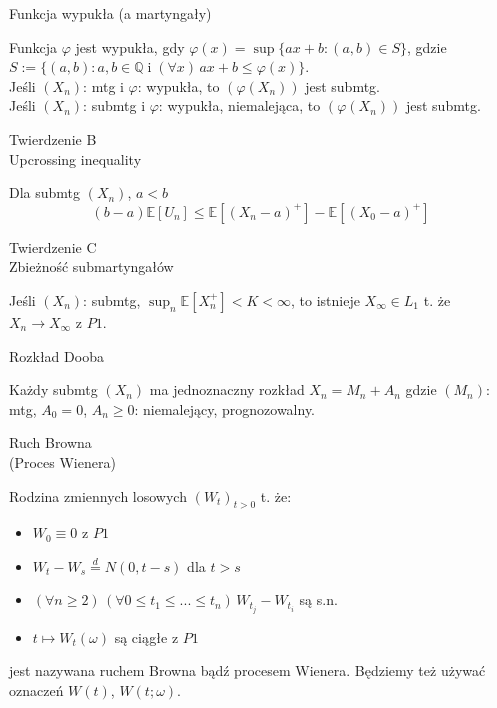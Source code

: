 \documentclass[avery5371,grid,frame]{flashcards}
\begin{document}
\begin{flashcard}[Definicja]{Funkcja wypukła (a martyngały)}

\smallskip
Funkcja $\varphi$ jest wypukła, gdy $\varphi(x) = \sup \{ ax+b : (a, b) \in S\}$, gdzie $S := \{(a, b) : a, b \in \mathbb{Q} \; \text{i} \; (\forall x) \, ax+b \leq \varphi(x) \}$. \\
Jeśli $(X_n)$: mtg i $\varphi$: wypukła, to $(\varphi(X_n))$ jest submtg. \\
Jeśli $(X_n)$: submtg i $\varphi$: wypukła, niemalejąca, to $(\varphi(X_n))$ jest submtg.
\end{flashcard}

\begin{flashcard}[Twierdzenie]{Twierdzenie B \\ Upcrossing inequality}

\smallskip
Dla submtg $(X_n)$, $ a < b $
$$ (b-a) \mathbb{E}[U_n] \leq \mathbb{E}[(X_n-a)^+] - \mathbb{E}[(X_0 - a)^+]$$
\end{flashcard}

\begin{flashcard}[Twierdzenie]{Twierdzenie C \\ Zbieżność submartyngałów}

\smallskip
Jeśli $(X_n)$: submtg, $\sup _n \mathbb{E}[X ^+ _n] < K < \infty$, to istnieje $X_\infty \in L_1$ t. że $X_n \rightarrow X_\infty$ z $P1$.
\end{flashcard}

\begin{flashcard}[Twierdzenie]{Rozkład Dooba}

\smallskip
Każdy submtg $(X_n)$ ma jednoznaczny rozkład $X_n = M_n + A_n$ gdzie $(M_n)$: mtg, $A_0 = 0$, $A_n \geq 0$: niemalejący, prognozowalny.
\end{flashcard}

\begin{flashcard}[]{}
\end{flashcard}


\begin{flashcard}[Definicja]{Ruch Browna \\ (Proces Wienera)}

Rodzina zmiennych losowych $ \left( W_t \right) _{t > 0} $ t. że:
\begin{itemize}
\item $W_0 \equiv 0$ z $P1$
\item $W_t - W_s \stackrel{d}{=} N(0, t-s)$ dla $ t > s $
\item $(\forall {n \geq 2}) \, (\forall { 0 \leq t_1 \leq ... \leq t_n }) \, W_{t_j} - W_{t_i}$ są s.n.
\item $t \mapsto W_t(\omega)$ są ciągłe z $P1$
\end{itemize}
jest nazywana ruchem Browna bądź procesem Wienera. Będziemy też używać oznaczeń $W(t)$, $W(t; \omega)$.
\end{flashcard}
\end{document}
